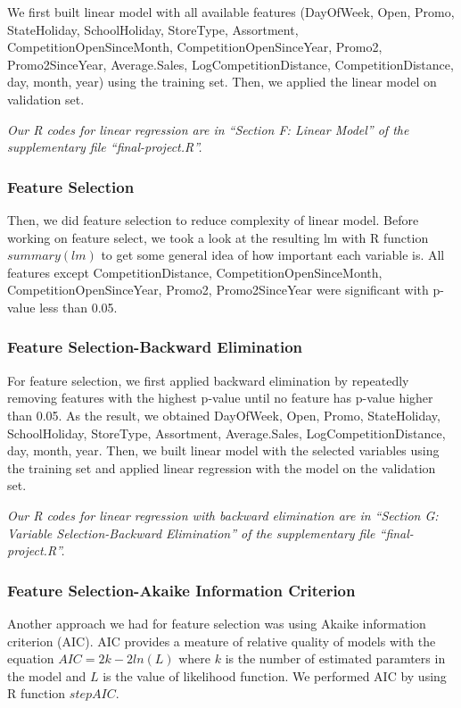 \documentclass[letterpaper,twocolumn,11pt]{article}
\begin{document}
We first built linear model with all available features (DayOfWeek, Open, Promo, StateHoliday, SchoolHoliday, StoreType, Assortment, CompetitionOpenSinceMonth, CompetitionOpenSinceYear, Promo2, Promo2SinceYear, Average.Sales, LogCompetitionDistance, CompetitionDistance, day, month, year) using the training set. Then, we applied the linear model on validation set.

\textit{Our R codes for linear regression are in ``Section F: Linear Model'' of the supplementary file ``final-project.R''.}

\subsubsection{Feature Selection}
Then, we did feature selection to reduce complexity of linear model. Before working on feature select, we took a look at the resulting lm with R function $summary(lm)$ to get some general idea of how important each variable is. All features except CompetitionDistance, CompetitionOpenSinceMonth, CompetitionOpenSinceYear, Promo2, Promo2SinceYear were significant with p-value less than 0.05.

\subsubsection{Feature Selection-Backward Elimination}
For feature selection, we first applied backward elimination by repeatedly removing features with the highest p-value until no feature has p-value higher than 0.05. As the result, we obtained DayOfWeek, Open, Promo, StateHoliday, SchoolHoliday, StoreType, Assortment, Average.Sales, LogCompetitionDistance, day, month, year. Then, we built linear model with the selected variables using the training set and applied linear regression with the model on the validation set.

\textit{Our R codes for linear regression with backward elimination are in ``Section G: Variable Selection-Backward Elimination'' of the supplementary file ``final-project.R''.}

\subsubsection{Feature Selection-Akaike Information Criterion}
Another approach we had for feature selection was using Akaike information criterion (AIC). AIC provides a meature of relative quality of models with the equation $AIC = 2k - 2 ln(L)$ where $k$ is the number of estimated paramters in the model and $L$ is the value of likelihood function. We performed AIC by using R function $stepAIC$.
\end{document}

